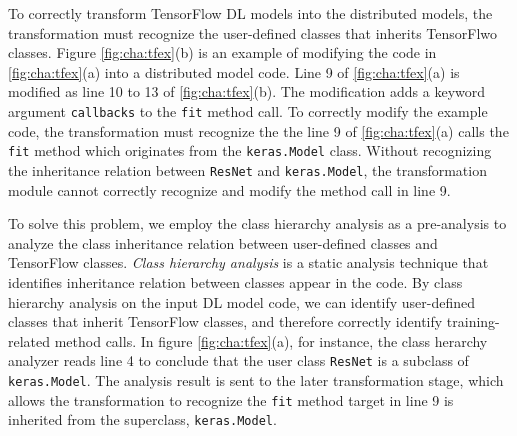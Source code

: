 To correctly transform TensorFlow DL models into the distributed models,
the transformation must recognize the user-defined classes that inherits
TensorFlwo classes.
Figure \ref{fig:cha:tfex}(b) is an example of modifying the code in 
\ref{fig:cha:tfex}(a) into a distributed model code.
Line 9 of \ref{fig:cha:tfex}(a) is modified as line 10 to 13 of 
\ref{fig:cha:tfex}(b). The modification adds a keyword argument {\tt callbacks}
to the {\tt fit} method call. 
To correctly modify the example code, the transformation must recognize the 
the line 9 of \ref{fig:cha:tfex}(a) calls the {\tt fit} method which originates
from the {\tt keras.Model} class.
Without recognizing the inheritance relation between {\tt ResNet} and
{\tt keras.Model}, the transformation module cannot correctly recognize
and modify the method call in line 9.  

To solve this problem, we employ the class hierarchy analysis as a pre-analysis
to analyze the class inheritance relation between user-defined classes
and TensorFlow classes.
\textit{Class hierarchy analysis} is a static analysis technique that identifies
inheritance relation between classes appear in the code.
By class hierarchy analysis on the input DL model code,
we can identify user-defined classes that inherit TensorFlow classes,
and therefore correctly identify training-related method calls.
In figure \ref{fig:cha:tfex}(a), for instance, 
the class herarchy analyzer reads line 4 to conclude that the user class
{\tt ResNet} is a subclass of {\tt keras.Model}.
The analysis result is sent to the later transformation stage,
which allows the transformation to recognize the {\tt fit} method
target in line 9 is inherited from the superclass, {\tt keras.Model}.
